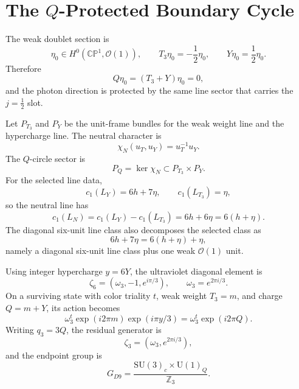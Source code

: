 \documentclass[11pt]{article}
\theoremstyle{definition}
\theoremstyle{remark}
\newcommand{\SU}{\mathrm{SU}}
\newcommand{\U}{\mathrm{U}}
\newcommand{\CP}{\mathbb{CP}}
\newcommand{\Z}{\mathbb{Z}}
\newcommand{\half}{\tfrac12}
\newcommand{\cO}{\mathcal O}
\begin{document}

\section{The \texorpdfstring{\(Q\)}{Q}-Protected Boundary Cycle}

The weak doublet section is
\[
  \eta_0\in H^0(\CP^1,\cO(1)),
  \qquad
  T_3\eta_0=-\frac12\eta_0,
  \qquad
  Y\eta_0=\frac12\eta_0.
\]
Therefore
\[
  Q\eta_0=(T_3+Y)\eta_0=0,
\]
and the photon direction is protected by the same line sector that carries
the \(j=\half\) slot.

Let \(P_{T_3}\) and \(P_Y\) be the unit-frame bundles for the weak weight line
and the hypercharge line.  The neutral character is
\[
  \chi_N(u_T,u_Y)=u_T^{-1}u_Y.
\]
The \(Q\)-circle sector is
\[
  P_Q=\ker\chi_N\subset P_{T_3}\times P_Y.
\]
For the selected line data,
\[
  c_1(L_Y)=6h+7\eta,\qquad c_1(L_{T_3})=\eta,
\]
so the neutral line has
\[
  c_1(L_N)=c_1(L_Y)-c_1(L_{T_3})
  =
  6h+6\eta
  =
  6(h+\eta).
\]
The diagonal six-unit line class also decomposes the selected class as
\[
  6h+7\eta=6(h+\eta)+\eta,
\]
namely a diagonal six-unit line class plus one weak \(\cO(1)\) unit.

Using integer hypercharge \(y=6Y\), the ultraviolet diagonal element is
\[
  \zeta_6=(\omega_3,-1,e^{i\pi/3}),
  \qquad
  \omega_3=e^{2\pi i/3}.
\]
On a surviving state with color triality \(t\), weak weight \(T_3=m\), and
charge \(Q=m+Y\), its action becomes
\[
  \omega_3^t\exp(i2\pi m)\exp(i\pi y/3)
  =
  \omega_3^t\exp(i2\pi Q).
\]
Writing \(q_3=3Q\), the residual generator is
\[
  \zeta_3=(\omega_3,e^{2\pi i/3}),
\]
and the endpoint group is
\[
  G_{D9}=
  \frac{\SU(3)_c\times\U(1)_Q}{\Z_3}.
\]
\end{document}

